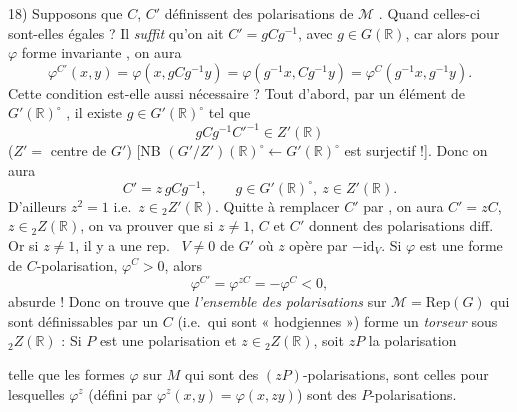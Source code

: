 \documentclass[11pt,a4paper]{article}
\begin{document}
18) Supposons que $C$, $C'$  définissent des
polarisations de $\mathcal{M}$ . Quand celles-ci
sont-elles égales ? Il \emph{suffit} qu'on ait $C' = gCg^{-1}$, avec $g \in
G(\mathbb{R})$, car alors pour $\varphi$ forme invariante \ill{}, on aura
\[
\varphi^{C'}(x, y) = \varphi(x, gCg^{-1} y) = \varphi(g^{-1}x, Cg^{-1}y)
= \varphi^{C}(g^{-1}x, g^{-1}y).
\]
Cette condition est-elle aussi nécessaire ?  \ill{}
  Tout d'abord,
\struck{\ill{}} \ill{} par un élément de $G'(\mathbb{R})^{\circ}$ \ill{}
 \ill{}, il existe $g \in
G'(\mathbb{R})^{\circ}$ tel que
\[
g C g^{-1} C'^{-1} \in Z'(\mathbb{R})
\]
($Z' =$ centre de $G'$) [NB $(G'/Z')(\mathbb{R})^{\circ} \longleftarrow
G'(\mathbb{R})^{\circ}$ est surjectif !]. Donc on aura
\[
C' = z\, g C g^{-1}, \qquad g \in G'(\mathbb{R})^{\circ},\ z \in Z'(\mathbb{R}).
\]
D'ailleurs $z^{2} = 1$ i.e.\ $z \in {}_2Z'(\mathbb{R})$. Quitte à remplacer
$C'$ par \ill{}, on aura $C' = zC$, $z \in {}_2Z(\mathbb{R})$, 
on va prouver que si $z \neq 1$, $C$ et $C'$ donnent des polarisations
diff. Or si $z \neq 1$, il y a une rep.\  $V \neq 0$ de
$G'$ où $z$ opère par $-\mathrm{id}_V$. Si $\varphi$ est une forme de
$C$-polarisation, $\varphi^{C} > 0$, alors
\[
\varphi^{C'} = \varphi^{zC} = -\varphi^{C} < 0,
\]
absurde ! Donc on trouve que \struck{\ill{}} \emph{l'ensemble des
polarisations} sur $\mathcal{M} = \mathrm{Rep}(G)$ qui sont définissables par
un $C$ (i.e.\ qui sont « hodgiennes ») forme un \emph{torseur} sous
${}_2Z(\mathbb{R})$ : Si $P$ est une polarisation  et $z \in
{}_2Z(\mathbb{R})$, soit $zP$  la polarisation

telle que les formes $\varphi$ sur $M$ qui sont des $(zP)$-polarisations,
sont celles pour lesquelles $\varphi^{z}$ (défini par $\varphi^{z}(x,y) =
\varphi(x, zy)$) sont  des $P$-polarisations.
\end{document}

